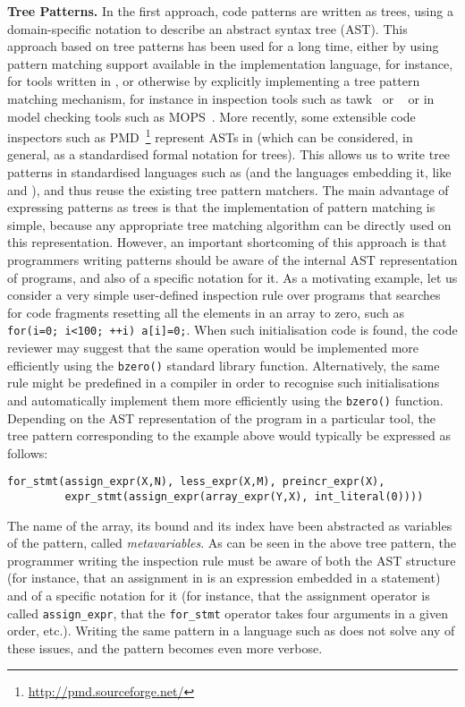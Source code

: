 \noindent\textbf{Tree Patterns.} In the first approach, code patterns
are written as trees, using a domain\hyp{}specific notation to
describe an abstract syntax tree (AST). This approach based on tree
patterns has been used for a long time, either by using pattern
matching support available in the implementation language, for
instance, for tools written in \ML, or otherwise by explicitly
implementing a tree pattern matching mechanism, for instance in
inspection tools such as \textsf{tawk}~\cite{tawk} or
\Scruple~\cite{scruple} or in model checking tools such as
\textsf{MOPS}~\cite{mops}. More recently, some extensible code
inspectors such as
\textsf{PMD}~\footnote{\url{http://pmd.sourceforge.net/}} represent
ASTs in \XML (which can be considered, in general, as a standardised
formal notation for trees). This allows us to write tree patterns in
standardised languages such as \XPath (and the languages embedding it,
like \XQuery and \XSLT), and thus reuse the existing tree pattern
matchers. The main advantage of expressing patterns as trees is that
the implementation of pattern matching is simple, because any
appropriate tree matching algorithm can be directly used on this
representation. However, an important shortcoming of this approach is
that programmers writing patterns should be aware of the internal AST
representation of programs, and also of a specific notation for it. As
a motivating example, let us consider a very simple user\hyp{}defined
inspection rule over \Clang programs that searches for code fragments
resetting all the elements in an array to zero, such as
\verb|for(i=0; i<100; ++i) a[i]=0;|. When such initialisation code is
found, the code reviewer may suggest that the same operation would be
implemented more efficiently using the \texttt{bzero()} standard
library function. Alternatively, the same rule might be predefined in
a compiler in order to recognise such initialisations and
automatically implement them more efficiently using the
\texttt{bzero()} function. Depending on the AST representation of the
\Clang program in a particular tool, the tree pattern corresponding to
the example above would typically be expressed as follows: {\small
\begin{verbatim}
for_stmt(assign_expr(X,N), less_expr(X,M), preincr_expr(X),
         expr_stmt(assign_expr(array_expr(Y,X), int_literal(0))))
\end{verbatim}
}
\noindent The name of the array, its bound and its index have been
abstracted as variables of the pattern, called
\emph{meta\-variables}. As can be seen in the above tree pattern, the
programmer writing the inspection rule must be aware of both the AST
structure (for instance, that an assignment in \Clang is an expression
embedded in a statement) and of a specific notation for it (for
instance, that the assignment operator is called
\texttt{assign\_expr}, that the \texttt{for\_stmt} operator takes four
arguments in a given order, etc.). Writing the same pattern in a
language such as \XPath does not solve any of these issues, and the
pattern becomes even more verbose.

